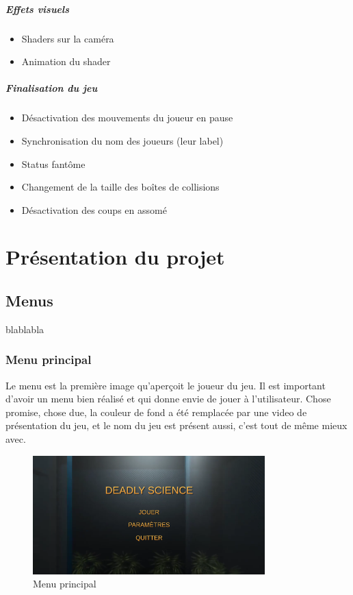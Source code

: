 \documentclass{article}
\begin{document}
\subparagraph{Effets visuels}

\begin{itemize}
    \item Shaders sur la caméra
    \item Animation du shader
\end{itemize}

\subparagraph{Finalisation du jeu}

\begin{itemize}
    \item Désactivation des mouvements du joueur en pause
    \item Synchronisation du nom des joueurs (leur label)
    \item Status fantôme
    \item Changement de la taille des boîtes de collisions
    \item Désactivation des coups en assomé
\end{itemize}






\newpage
\section{Présentation du projet}



\subsection{Menus}
blablabla
\subsubsection{Menu principal}

Le menu est la première image qu'aperçoit le joueur du jeu. Il est important d'avoir un menu bien réalisé et qui donne envie de jouer à l'utilisateur. Chose promise, chose due, la couleur de fond a été remplacée par une video de présentation du jeu, et le nom du jeu est présent aussi, c'est tout de même mieux avec.

\begin{figure}[!h]
	\centering
	\includegraphics[width=0.8\textwidth]{MainMenu.png}
	\caption{Menu principal}
	\label{Menu principal}
\end{figure}
\end{document}
